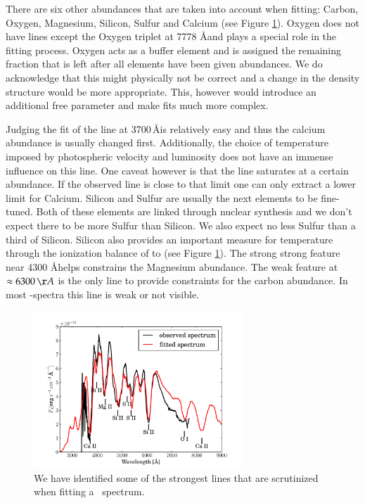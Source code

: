 There are six other abundances that are taken into account when fitting: Carbon, Oxygen, Magnesium, Silicon, Sulfur and Calcium (see Figure \ref{fig:sn2002bo_lineident}). Oxygen does not have lines except the Oxygen triplet at 7778 \AA and plays a special role in the fitting process. Oxygen acts as a buffer element and is assigned the remaining fraction that is left after all elements have been given abundances. We do acknowledge that this might physically not be correct and a change in the density structure would be more appropriate. This, however would introduce an additional free parameter and make fits much more complex.

Judging the fit of the  line at 3700\,\AA is relatively easy and thus the calcium abundance is usually changed first. Additionally, the choice of temperature imposed by photospheric velocity and luminosity does not have an immense influence on this line. One caveat however is that the  line saturates at a certain abundance. If the observed  line is close to that limit one can only extract a lower limit for Calcium.
Silicon and Sulfur are usually the next elements to be fine-tuned. Both of these elements are linked through nuclear synthesis and we don't expect there to be more Sulfur than Silicon. We also expect no less Sulfur than a third of Silicon. Silicon also provides an important measure for temperature through the ionization balance of  to  (see Figure \ref{fig:sn2002bo_lineident}). The strong strong  feature near 4300 \AA helps constrains the Magnesium abundance. The weak  feature at $\approx 6300\,\AA$ is the only line to provide constraints for the carbon abundance. In most \sneia-spectra this line is weak or not visible.
\begin{figure}[htbp] %
   \centering
   \includegraphics[width=0.7\textwidth]{chapter_dalek/plots/bf2002bo-10_lineid.pdf} 
   \caption{We have identified some of the strongest lines that are scrutinized when fitting a \sneia\ spectrum.}
   \label{fig:sn2002bo_lineident}
\end{figure}

